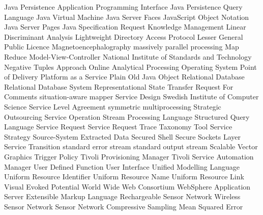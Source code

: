 \begin{acronym}[YTM]
  {Java Persistence Application Programming Interface}
 {Java Persistence Query Language}
  {Java Virtual Machine}
  {Java Server Faces}
 {JavaScript Object Notation}
  {Java Server Pages}
  {Java Specification Request}
   {Knowledge Management}
	{Linear Discriminant Analysis}
 {Lightweight Directory Access Protocol}
 {Lesser General Public Licence}
	{Magnetoencephalography}
	{massively parallel processing}
	{Map Reduce}
  {Model-View-Controller}
 {National Institute of Standards and Technology}
  {Negative Tuples Approach}
 {Online Analytical Processing} 
   {Operating System}
  {Point of Delivery}
 {Platform as a Service}
 {Plain Old Java Object}
  {Relational Database}
 {Relational Database System}
 {Representational State Transfer}
	{Request For Comments}
	{situation-aware mapper}
   {Service Design}
	{Swedish Institute of Computer Science}
  {Service Level Agreement}
	{symmetric multiprocessing}
	{Strategic Outsourcing}
  {Service Operation}
  {Stream Processing Language}
	{Structured Query Language}
   {Service Request}
 {Service Request Trace Taxonomy Tool}
   {Service Strategy}
 {Source-System Extracted Data}
  {Secured Shell}
  {Secure Sockets Layer}
   {Service Transition}
 {standard error stream}
 {standard output stream}
  {Scalable Vector Graphics}
   {Trigger Policy}
  {Tivoli Provisioning Manager}
 {Tivoli Service Automation Manager}
	{User Defined Function}
   {User Interface}
  {Unified Modelling Language}
  {Uniform Resource Identifier}
  {Uniform Resource Name}
  {Uniform Resource Link}
	{Visual Evoked Potential}
  {World Wide Web Consortium}
  {WebSphere Application Server}
  {Extensible Markup Language}
  {Rechargeable Sensor Network}
  {Wireless Sensor Network}
   {Sensor Network}
   {Compressive Sampling}
  {Mean Squared Error}
\end{acronym}
